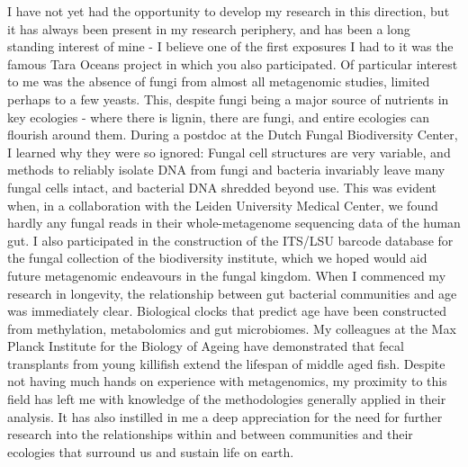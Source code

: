 \documentclass[letterpaper, 10pt]{article} %
\begin{document}
\begin{tcolorbox}[
	blanker,
	width=0.95\textwidth,
	enlarge left by=0.025\textwidth,
	enlarge right by=0.025\textwidth,
	before skip=6pt,
	breakable]
I have not yet had the opportunity to develop my research in this direction, but it has always been present in my research periphery, and has been a long standing interest of mine - I believe one of the first exposures I had to it was the famous Tara Oceans project in which you also participated. Of particular interest to me was the absence of fungi from almost all metagenomic studies, limited perhaps to a few yeasts. This, despite fungi being a major source of nutrients in key ecologies - where there is lignin, there are fungi, and entire ecologies can flourish around them. During a postdoc at the Dutch Fungal Biodiversity Center, I learned why they were so ignored: Fungal cell structures are very variable, and methods to reliably isolate DNA from fungi and bacteria invariably leave many fungal cells intact, and bacterial DNA shredded beyond use. This was evident when, in a collaboration with the Leiden University Medical Center, we found hardly any fungal reads in their whole-metagenome sequencing data of the human gut. I also participated in the construction of the ITS/LSU barcode database for the fungal collection of the biodiversity institute, which we hoped would aid future metagenomic endeavours in the fungal kingdom. When I commenced my research in longevity, the relationship between gut bacterial communities and age was immediately clear. Biological clocks that predict age have been constructed from methylation, metabolomics and gut microbiomes. My colleagues at the Max Planck Institute for the Biology of Ageing have demonstrated that fecal transplants from young killifish extend the lifespan of middle aged fish. Despite not having much hands on experience with metagenomics, my proximity to this field has left me with knowledge of the methodologies generally applied in their analysis. It has also instilled in me a deep appreciation for the need for further research into the relationships within and between communities and their ecologies that surround us and sustain life on earth.


\end{tcolorbox}
\end{document}
